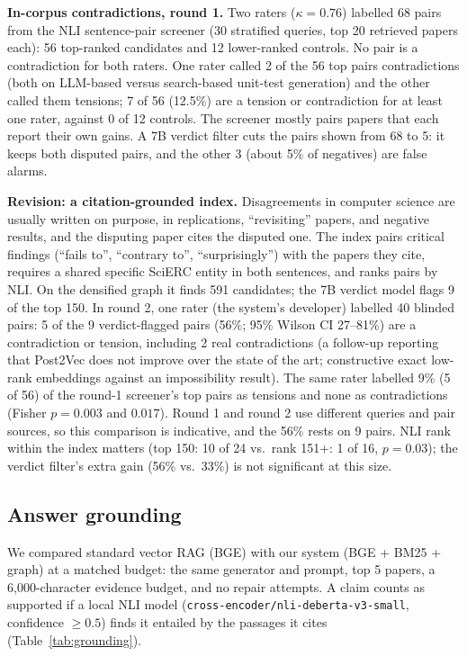 \documentclass[conference]{IEEEtran}
\begin{document}
\textbf{In-corpus contradictions, round 1.} Two raters ($\kappa = 0.76$) labelled 68 pairs from the NLI sentence-pair screener (30 stratified queries, top 20 retrieved papers each): 56 top-ranked candidates and 12 lower-ranked controls. No pair is a contradiction for both raters. One rater called 2 of the 56 top pairs contradictions (both on LLM-based versus search-based unit-test generation) and the other called them tensions; 7 of 56 (12.5\%) are a tension or contradiction for at least one rater, against 0 of 12 controls. The screener mostly pairs papers that each report their own gains. A 7B verdict filter cuts the pairs shown from 68 to 5: it keeps both disputed pairs, and the other 3 (about 5\% of negatives) are false alarms.

\textbf{Revision: a citation-grounded index.} Disagreements in computer science are usually written on purpose, in replications, ``revisiting'' papers, and negative results, and the disputing paper cites the disputed one. The index pairs critical findings (``fails to'', ``contrary to'', ``surprisingly'') with the papers they cite, requires a shared specific SciERC entity in both sentences, and ranks pairs by NLI. On the densified graph it finds 591 candidates; the 7B verdict model flags 9 of the top 150. In round 2, one rater (the system's developer) labelled 40 blinded pairs: 5 of the 9 verdict-flagged pairs (56\%; 95\% Wilson CI 27--81\%) are a contradiction or tension, including 2 real contradictions (a follow-up reporting that Post2Vec does not improve over the state of the art; constructive exact low-rank embeddings against an impossibility result). The same rater labelled 9\% (5 of 56) of the round-1 screener's top pairs as tensions and none as contradictions (Fisher $p = 0.003$ and $0.017$). Round 1 and round 2 use different queries and pair sources, so this comparison is indicative, and the 56\% rests on 9 pairs. NLI rank within the index matters (top 150: 10 of 24 vs.\ rank 151+: 1 of 16, $p = 0.03$); the verdict filter's extra gain (56\% vs.\ 33\%) is not significant at this size.

\subsection{Answer grounding}
\label{sec:grounding}

We compared standard vector RAG (BGE) with our system (BGE + BM25 + graph) at a matched budget: the same generator and prompt, top 5 papers, a 6,000-character evidence budget, and no repair attempts. A claim counts as supported if a local NLI model (\texttt{cross-encoder/nli-deberta-v3-small}, confidence $\geq 0.5$) finds it entailed by the passages it cites (Table~\ref{tab:grounding}).
\end{document}
